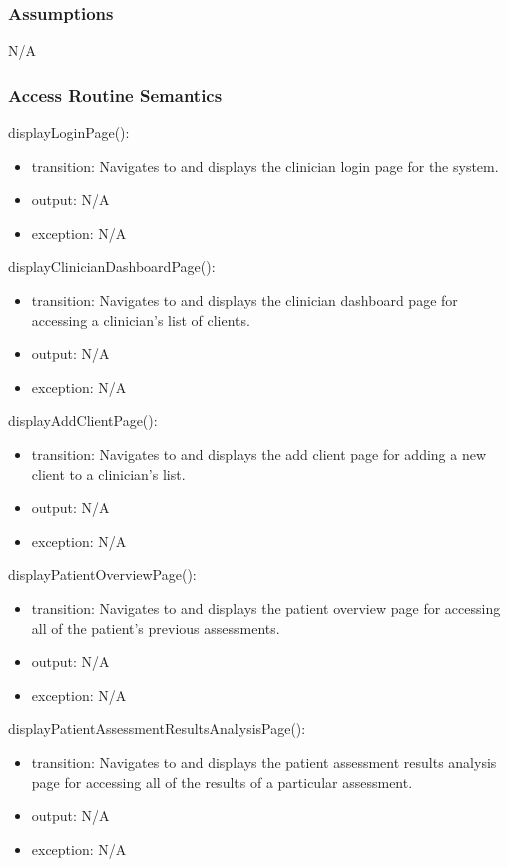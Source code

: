 \documentclass[12pt, titlepage]{article}
\begin{document}
\subsubsection{Assumptions}
N/A

\subsubsection{Access Routine Semantics}

\noindent displayLoginPage():
\begin{itemize}
\item transition: Navigates to and displays the clinician login page for the system.
\item output: N/A
\item exception: N/A
\end{itemize}

\noindent displayClinicianDashboardPage():
\begin{itemize}
\item transition: Navigates to and displays the clinician dashboard page for accessing a clinician's list of clients.
\item output: N/A
\item exception: N/A
\end{itemize}

\noindent displayAddClientPage():
\begin{itemize}
\item transition: Navigates to and displays the add client page for adding a new client to a clinician's list.
\item output: N/A
\item exception: N/A
\end{itemize}

\noindent displayPatientOverviewPage():
\begin{itemize}
\item transition: Navigates to and displays the patient overview page for accessing all of the patient's previous assessments.
\item output: N/A
\item exception: N/A
\end{itemize}

\noindent displayPatientAssessmentResultsAnalysisPage():
\begin{itemize}
\item transition: Navigates to and displays the patient assessment results analysis page for accessing all of the results of a particular assessment.
\item output: N/A
\item exception: N/A
\end{itemize}
\end{document}
